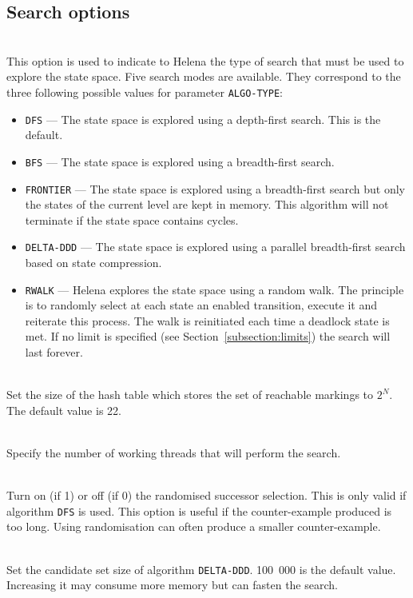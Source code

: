 \subsection{Search options}
\begin{description}
\item{}\\ This option is used to
  indicate to Helena the type of search that must be used to explore
  the state space. Five search modes are available. They correspond to
  the three following possible values for parameter
  \texttt{ALGO-TYPE}:
\begin{itemize}
\item\texttt{DFS} --- The state space is explored using a depth-first
  search.  This is the default.
\item\texttt{BFS} --- The state space is explored using a
  breadth-first search.
\item\texttt{FRONTIER} --- The state space is explored using a
  breadth-first search but only the states of the current level are
  kept in memory.  This algorithm will not terminate if the state
  space contains cycles.
\item\texttt{DELTA-DDD} --- The state space is explored using a
  parallel breadth-first search based on state compression.
\item\texttt{RWALK} --- Helena explores the state space using a random
  walk.  The principle is to randomly select at each state an enabled
  transition, execute it and reiterate this process.  The walk is
  reinitiated each time a deadlock state is met.  If no limit is
  specified (see Section~\ref{subsection:limits}) the search will last
  forever.
\end{itemize}
\item{}\\ Set the size of the hash table
  which stores the set of reachable markings to $2^N$.  The default
  value is 22.
\item{}\\ Specify the number of working
  threads that will perform the search.
\item{}\\ Turn on (if 1)
  or off (if 0) the randomised successor selection.  This is only
  valid if algorithm \texttt{DFS} is used.  This option is useful if
  the counter-example produced is too long.  Using randomisation can
  often produce a smaller counter-example.
\item{}\\ Set the candidate set
  size of algorithm \texttt{DELTA-DDD}.  100~000 is the default value.
  Increasing it may consume more memory but can fasten the search.
\end{description}


